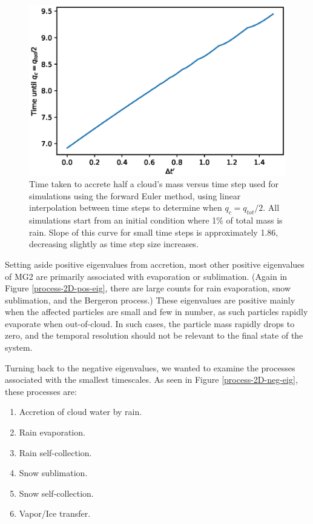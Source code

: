 \documentclass [11pt, proquest] {uwthesis}[2020/02/24]
\begin{document}
\begin{figure}[htbp]
  \includegraphics[width=6.5in]{./accretion_half_time.eps}
  \caption[Time to accrete half of a cloud's mass]{Time taken to accrete half a cloud's mass versus time step used for simulations using the forward Euler method, using linear interpolation between time steps to determine when $q_c=q_{tot}/2$. All simulations start from an initial condition where 1\% of total mass is rain. Slope of this curve for small time steps is approximately \num{1.86}, decreasing slightly as time step size increases.}
  \label{accretion-time}
\end{figure}

Setting aside positive eigenvalues from accretion, most other positive eigenvalues of MG2 are primarily associated with evaporation or sublimation. (Again in Figure \ref{process-2D-pos-eig}, there are large counts for rain evaporation, snow sublimation, and the Bergeron process.) These eigenvalues are positive mainly when the affected particles are small and few in number, as such particles rapidly evaporate when out-of-cloud. In such cases, the particle mass rapidly drops to zero, and the temporal resolution should not be relevant to the final state of the system.

Turning back to the negative eigenvalues, we wanted to examine the processes associated with the smallest timescales. As seen in Figure \ref{process-2D-neg-eig}, these processes are:

\begin{enumerate}
\item Accretion of cloud water by rain.
\item Rain evaporation.
\item Rain self-collection.
\item Snow sublimation.
\item Snow self-collection.
\item Vapor/Ice transfer.
\end{enumerate}
\end{document}
